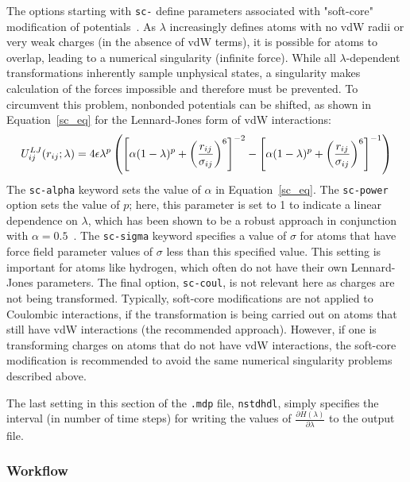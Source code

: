 \documentclass[9pt,tutorial,pubversion]{livecoms}
\begin{document}
The options starting with \texttt{sc-} define parameters associated with "soft-core" modification of potentials~\cite{Beutler1994}. As $\lambda$ increasingly defines atoms with no vdW radii or very weak charges (in the absence of vdW terms), it is possible for atoms to overlap, leading to a numerical singularity (infinite force). While all $\lambda$-dependent transformations inherently sample unphysical states, a singularity makes calculation of the forces impossible and therefore must be prevented. To circumvent this problem, nonbonded potentials can be shifted, as shown in Equation~\ref{sc_eq} for the Lennard-Jones form of vdW interactions: 
\begin{equation} \label{sc_eq}
\footnotesize
U_{ij}^{LJ} (r_{ij};\lambda) = 4\epsilon\lambda^p\left(\left[\alpha(1-\lambda)^p + \left(\frac{r_{ij}}{\sigma_{ij}}\right)^6\right]^{-2} - \left[\alpha(1-\lambda)^p + \left(\frac{r_{ij}}{\sigma_{ij}}\right)^6\right]^{-1}\right)
\end{equation}
%
The \texttt{sc-alpha} keyword sets the value of $\alpha$ in Equation~\ref{sc_eq}. The \texttt{sc-power} option sets the value of $p$; here, this parameter is set to 1 to indicate a linear dependence on $\lambda$, which has been shown to be a robust approach in conjunction with $\alpha = 0.5$~\cite{Pitera2002,Steinbrecher2007,Shirts2005}. The \texttt{sc-sigma} keyword specifies a value of $\sigma$ for atoms that have force field parameter values of $\sigma$ less than this specified value. This setting is important for atoms like hydrogen, which often do not have their own Lennard-Jones parameters. The final option, \texttt{sc-coul}, is not relevant here as charges are not being transformed. Typically, soft-core modifications are not applied to Coulombic interactions, if the transformation is being carried out on atoms that still have vdW interactions (the recommended approach). However, if one is transforming charges on atoms that do not have vdW interactions, the soft-core modification is recommended to avoid the same numerical singularity problems described above.

The last setting in this section of the \texttt{.mdp} file, \texttt{nstdhdl}, simply specifies the interval (in number of time steps) for writing the values of $\frac{\partial H(\lambda)}{\partial \lambda}$ to the output file.

\subsubsection{Workflow} \label{vdw_workflow}
\end{document}
